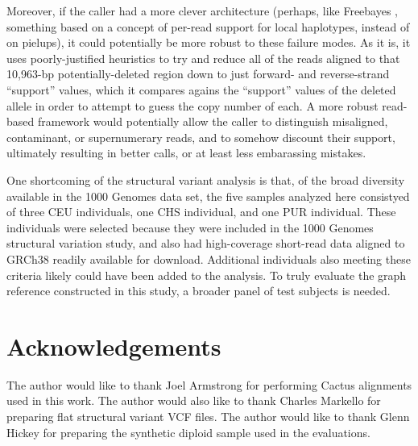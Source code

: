 Moreover, if the caller had a more clever architecture (perhaps, like Freebayes \cite{garrison2012haplotype}, something based on a concept of per-read support for local haplotypes, instead of on pielups), it could potentially be more robust to these failure modes. As it is, it uses poorly-justified heuristics to try and reduce all of the reads aligned to that 10,963-bp potentially-deleted region down to just forward- and reverse-strand ``support'' values, which it compares agains the ``support'' values of the deleted allele in order to attempt to guess the copy number of each. A more robust read-based framework would potentially allow the caller to distinguish misaligned, contaminant, or supernumerary reads, and to somehow discount their support, ultimately resulting in better calls, or at least less embarassing mistakes.

One shortcoming of the structural variant analysis is that, of the broad diversity available in the 1000 Genomes data set, the five samples analyzed here consistyed of three CEU individuals, one CHS individual, and one PUR individual. These individuals were selected because they were included in the 1000 Genomes structural variation study, and also had high-coverage short-read data aligned to GRCh38 readily available for download. Additional individuals also meeting these criteria likely could have been added to the analysis. To truly evaluate the graph reference constructed in this study, a broader panel of test subjects is needed.

\section{Acknowledgements}

The author would like to thank Joel Armstrong for performing Cactus alignments used in this work. The author would also like to thank Charles Markello for preparing flat structural variant VCF files. The author would like to thank Glenn Hickey for preparing the synthetic diploid sample used in the evaluations.

        
